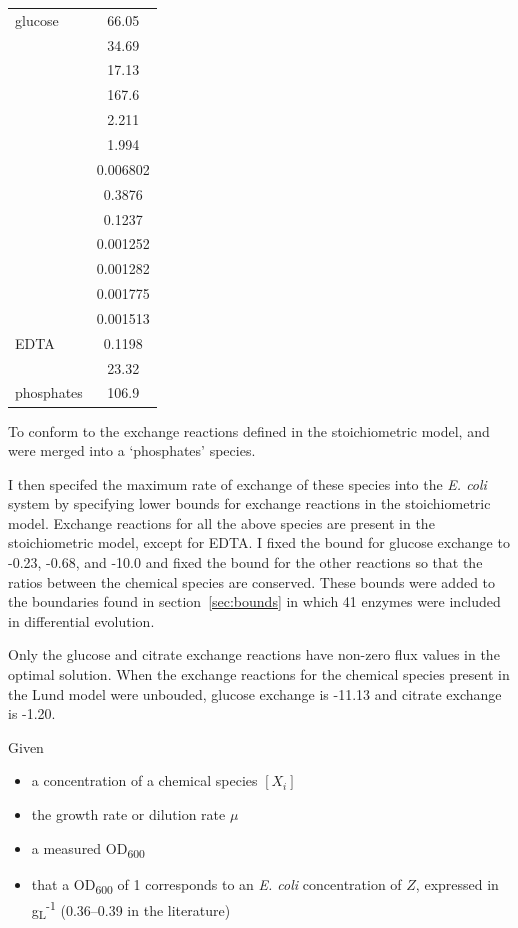 \documentclass[parskip=full]{scrreprt}
\begin{document}
\begin{tabular}{lS}
  glucose & 66.05\\
   & 34.69\\
   & 17.13\\
   & 167.6\\
   & 2.211\\
   & 1.994\\
   & 0.006802\\
   & 0.3876\\
   & 0.1237\\
   & 0.001252\\
   & 0.001282\\
   & 0.001775\\
   & 0.001513\\
  EDTA & 0.1198\\
   & 23.32\\
  phosphates & 106.9
\end{tabular}

To conform to the exchange reactions defined in the stoichiometric model,  and  were merged into a `phosphates' species.

I then specifed the maximum rate of exchange of these species into the \emph{E. coli} system by specifying lower bounds for exchange reactions in the stoichiometric model. Exchange reactions for all the above species are present in the stoichiometric model, except for EDTA. I fixed the bound for glucose exchange to -0.23, -0.68, and -10.0 and fixed the bound for the other reactions so that the ratios between the chemical species are conserved. These bounds were added to the boundaries found in section~\ref{sec:bounds} in which 41 enzymes were included in differential evolution.

Only the glucose and citrate exchange reactions have non-zero flux values in the optimal solution. When the exchange reactions for the chemical species present in the Lund model were unbouded, glucose exchange is -11.13 and citrate exchange is -1.20.

Given
\begin{itemize}
\item a concentration of a chemical species $[X_{i}]$
\item the growth rate or dilution rate $\mu$
\item a measured OD\textsubscript{600}
\item that a OD\textsubscript{600} of 1 corresponds to an \emph{E. coli} concentration of $Z$, expressed in g\textsubscript L\textsuperscript{-1} (0.36--0.39 in the literature) %
\end{itemize}
  
\end{document}
